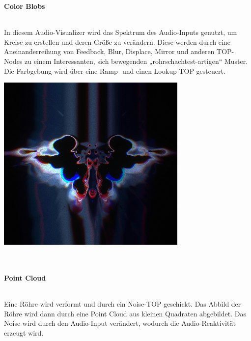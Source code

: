 \documentclass[12pt]{scrartcl}%
\theoremstyle{nonumberplain}
\begin{document}
\textbf{Color Blobs}\\\\
\begin{minipage}{0.4\textwidth}
In diesem Audio-Visualizer wird das Spektrum des Audio-Inputs genutzt, um Kreise zu erstellen und deren Größe zu verändern. Diese werden durch eine Aneinanderreihung von Feedback, Blur, Displace, Mirror und anderen TOP-Nodes zu einem Interessanten, sich bewegenden „rohrschachtest-artigen“ Muster. Die Farbgebung wird über eine Ramp- und einen Lookup-TOP gesteuert.
\vspace{60pt}
\end{minipage}
\hspace{20pt}
\begin{minipage}{0.5\textwidth}
  \centering
  \includegraphics[width=\textwidth]{td_2}
\end{minipage}
\\\\
\textbf{Point Cloud}\\\\
\begin{minipage}{0.4\textwidth}
 Eine Röhre wird verformt und durch ein Noise-TOP geschickt. Das Abbild der Röhre wird dann durch 	eine Point Cloud aus kleinen Quadraten abgebildet. Das Noise wird durch den Audio-Input verändert, 	wodurch die Audio-Reaktivität erzeugt wird.
\vspace{110pt}
\end{minipage}
\end{document}
